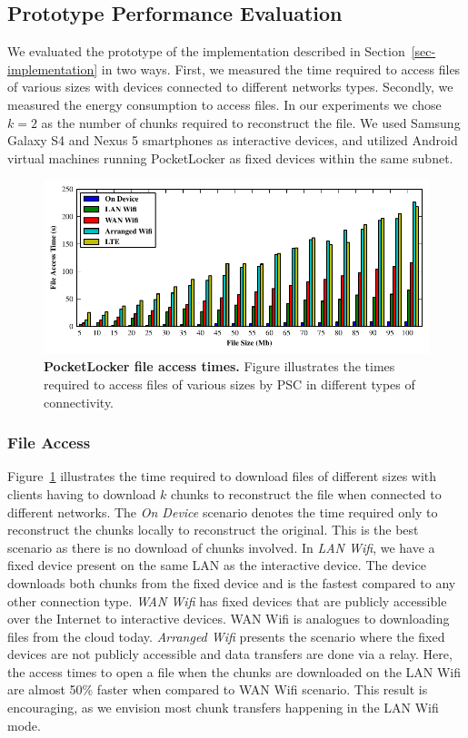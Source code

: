 \subsection{Prototype Performance Evaluation}
We evaluated the prototype of the implementation described in
Section~\ref{sec-implementation} in two ways. First, we
measured the time required to access files of various sizes with devices
connected to different networks types. Secondly, we measured
the energy consumption to access files. In our experiments we chose $k=2$ as
the number of chunks required to reconstruct the file. We used Samsung Galaxy
S4 and Nexus 5 smartphones as interactive devices, and utilized Android virtual machines
running PocketLocker as fixed devices within the same subnet.
\begin{figure}[t]

  \includegraphics[width=\textwidth]{./figures/downloadtimes.pdf}

  \caption{\small \textbf{PocketLocker file access times.} Figure
    illustrates the
    times required to access files of various sizes by PSC in different
    types of
  connectivity.}

  \label{fig-evaluation-download}

\end{figure}


\subsubsection{File Access}
\label{sec-fileaccess}
Figure~\ref{fig-evaluation-download} illustrates the time required to download
files of different sizes with clients having to download $k$ chunks to
reconstruct the file when connected to different networks.
The \textit{On Device} scenario denotes the time required only to reconstruct the
chunks locally to reconstruct the original. This is the best scenario 
as there is no download of chunks involved.
In \textit{LAN Wifi}, we have a fixed device present on the same LAN as the 
interactive
device. The device downloads both chunks from the fixed device and is the
fastest compared to any other connection type. \textit{WAN Wifi} has fixed devices that are publicly accessible over the
Internet to interactive devices. WAN Wifi is analogues to downloading files from
the cloud today. \textit{Arranged Wifi} presents the scenario where the
fixed devices are not publicly accessible and data transfers are done via a
relay. Here, the access times to open a file when the chunks are
downloaded on the LAN Wifi are almost 50\% faster when compared to WAN Wifi
scenario. This result is encouraging, as we envision most chunk
transfers happening in the LAN Wifi mode. 

